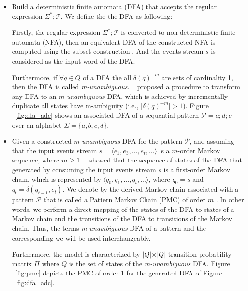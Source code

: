 \begin{itemize}[noitemsep]
	\item Build a deterministic finite automata (DFA) that accepts the regular expression $\Sigma^{*};\mathcal{P}$. We define the the DFA as following:
	
	Firstly, the regular expression $\Sigma^{*};\mathcal{P}$ is converted to non-deterministic finite automata (NFA), then an equivalent DFA of the constructed NFA is computed using the subset construction \cite{hopcroft2006automata,alevizos2017event}. And the events stream $s$ is considered as the input word of the DFA. 

\par Furthermore, if $\forall q \in Q$ of a DFA the all $\delta(q)^{-m}$ are sets of cardinality 1, then the DFA is called \textit{m-unambiguous}. ~\citet{nuel_pattern_2008} proposed a procedure to transform any DFA to an \textit{m-unambiguous} DFA, which is achieved by incrementally duplicate all states have m-ambiguity (i.e., $\vert\delta(q)^{-m}\vert > 1$).   Figure ~\ref{fig:dfa_adc} shows an associated DFA of a sequential pattern $\mathcal{P}=a ; d ; c$ over an alphabet $\Sigma=\{a,b,c,d\}$. 





\item  Given a constructed \textit{m-unambiguous} DFA for the pattern $\mathcal{P}$, and  assuming that the input events stream $s=\langle e_1,e_3,...,e_t,...\rangle$ is a $m$-order Markov sequence, where $m \geq 1$.  ~\citet{nuel_pattern_2008} showed that the sequence of states of the DFA that generated by consuming the input events stream $s$ is a first-order Markov chain, which is represented by $\langle q_{0},q_{1},...,q_{t},...\rangle$, where $q_{0}=s$ and $q_{t}=\delta(q_{t-1},e_{t})$. We denote by \pmcmr  the derived Markov chain associated with a pattern $\mathcal{P}$ that is called a Pattern Markov Chain (PMC) of order $m$ \cite{nuel_pattern_2008}. In other words, we perform a direct mapping of the states of the DFA to states of a Markov chain and the transitions of the DFA to transitions of the Markov chain. Thus, the terms \textit{m-unambiguous} DFA of a pattern and the corresponding \pmcmr  we will be used interchangeably. 

\par Furthermore, the \pmcmr model is characterized by $\vert Q \vert \times \vert Q \vert$ transition probability matrix $\Pi$ where $Q$ is the set of states of the  \textit{m-unambiguous} DFA. Figure ~\ref{fig:pmc} depicts the PMC of order 1 for the generated DFA of Figure ~\ref{fig:dfa_adc}.


\end{itemize}
